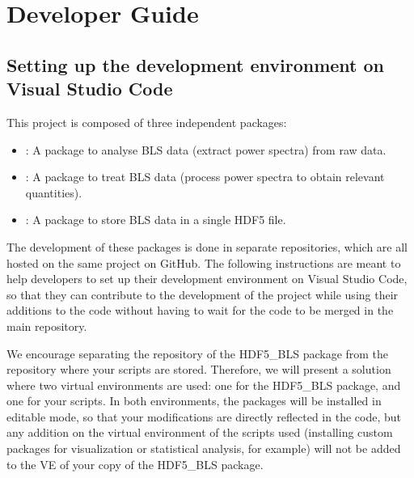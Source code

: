 \documentclass[letterpaper,10pt,english]{sphinxmanual}
\begin{document}
\part{Developer Guide}

\sphinxstepscope


\chapter{Setting up the development environment on Visual Studio Code}
\label{\detokenize{source/developer/setup:setting-up-the-development-environment-on-visual-studio-code}}\label{\detokenize{source/developer/setup:developer-setup-vscode}}\label{\detokenize{source/developer/setup::doc}}
\sphinxAtStartPar
This project is composed of three independent packages:
\begin{itemize}
\item {} 
\sphinxAtStartPar
{}: A package to analyse BLS data (extract power spectra) from raw data.

\item {} 
\sphinxAtStartPar
{}: A package to treat BLS data (process power spectra to obtain relevant quantities).

\item {} 
\sphinxAtStartPar
{}: A package to store BLS data in a single HDF5 file.

\end{itemize}

\sphinxAtStartPar
The development of these packages is done in separate repositories, which are all hosted on the same project on GitHub. The following instructions are meant to help developers to set up their development environment on Visual Studio Code, so that they can contribute to the development of the project while using their additions to the code without having to wait for the code to be merged in the main repository.

\sphinxAtStartPar
We encourage separating the repository of the HDF5\_BLS package from the repository where your scripts are stored. Therefore, we will present a solution where two virtual environments are used: one for the HDF5\_BLS package, and one for your scripts. In both environments, the packages will be installed in editable mode, so that your modifications are directly reflected in the code, but any addition on the virtual environment of the scripts used (installing custom packages for visualization or statistical analysis, for example) will not be added to the VE of your copy of the HDF5\_BLS package.
\end{document}
